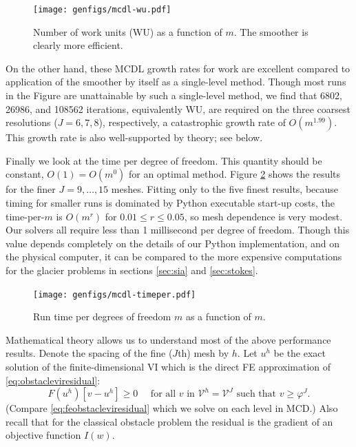 \documentclass[letterpaper,final,12pt,reqno]{amsart}
\theoremstyle{claim}
\numberwithin{equation}{section}
\numberwithin{figure}{section}
\numberwithin{table}{section}
\numberwithin{theorem}{section}
\begin{document}
\begin{figure}
\texttt{[image: genfigs/mcdl-wu.pdf]}
\caption{Number of work units (WU) as a function of $m$.  The  smoother is clearly more efficient.}
\label{fig:mcdl-wu}
\end{figure}

On the other hand, these MCDL growth rates for work are excellent compared to application of the smoother by itself as a single-level method.  Though most runs in the Figure are unattainable by such a single-level method, we find that 6802, 26986, and 108562 iterations, equivalently WU, are required on the three coarsest resolutions ($J=6,7,8$), respectively, a catastrophic growth rate of $O(m^{1.99})$.  This growth rate is also well-supported by theory; see below.

Finally we look at the time per degree of freedom.  This quantity should be constant, $O(1)=O(m^0)$ for an optimal method.  Figure \ref{fig:mcdl-timeper} shows the results for the finer $J=9,\dots,15$ meshes.  Fitting only to the five finest results, because timing for smaller runs is dominated by Python executable start-up costs, the time-per-$m$ is $O(m^r)$ for $0.01 \le r \le 0.05$, so mesh dependence is very modest.  Our  solvers all require less than 1 millisecond per degree of freedom.  Though this value depends completely on the details of our Python implementation, and on the physical computer, it can be compared to the more expensive computations for the glacier problems in sections \ref{sec:sia} and \ref{sec:stokes}.

\begin{figure}
\texttt{[image: genfigs/mcdl-timeper.pdf]}
\caption{Run time per degrees of freedom $m$ as a function of $m$.}
\label{fig:mcdl-timeper}
\end{figure}

Mathematical theory allows us to understand most of the above performance results.   Denote the spacing of the fine ($J$th) mesh by $h$.  Let $u^h$ be the exact solution of the finite-dimensional VI which is the direct FE approximation of \eqref{eq:obstacleviresidual}:
\begin{equation}
  F(u^h)[v-u^h] \ge 0 \quad \text{ for all } v \text{ in $\mathcal{V}^h=\mathcal{V}^J$ such that } v \ge \varphi^J. \label{eq:feobstaclevioriginal}
\end{equation}
(Compare \eqref{eq:feobstacleviresidual} which we solve on each level in MCD.)  Also recall that for the classical obstacle problem the residual is the gradient of an objective function $I(w)$.
\end{document}
